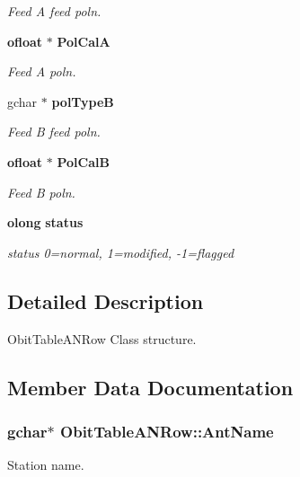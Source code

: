 \begin{CompactItemize}
\begin{CompactList}\small\item\em Feed A feed poln. \item\end{CompactList}\item 
{\bf ofloat} $\ast$ {\bf Pol\-Cal\-A}
\begin{CompactList}\small\item\em Feed A poln. \item\end{CompactList}\item 
gchar $\ast$ {\bf pol\-Type\-B}
\begin{CompactList}\small\item\em Feed B feed poln. \item\end{CompactList}\item 
{\bf ofloat} $\ast$ {\bf Pol\-Cal\-B}
\begin{CompactList}\small\item\em Feed B poln. \item\end{CompactList}\item 
{\bf olong} {\bf status}
\begin{CompactList}\small\item\em status 0=normal, 1=modified, -1=flagged \item\end{CompactList}\end{CompactItemize}


\subsection{Detailed Description}
Obit\-Table\-ANRow Class structure. 



\subsection{Member Data Documentation}
\subsubsection{\setlength{\rightskip}{0pt plus 5cm}gchar$\ast$ {\bf Obit\-Table\-ANRow::Ant\-Name}}\label{structObitTableANRow_o11}


Station name. 

